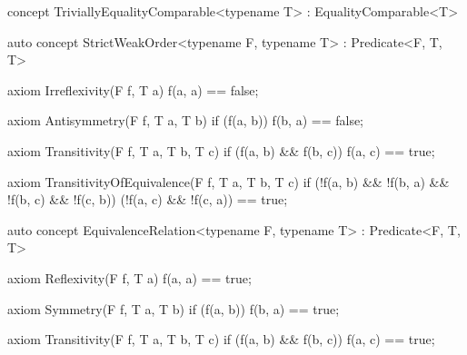 \documentclass[american,twoside]{book}
\begin{document}
\begin{itemdescr}
\pnum
{}
\end{itemdescr}

\begin{itemdecl}
concept TriviallyEqualityComparable<typename T> : EqualityComparable<T> { }
\end{itemdecl}

\begin{itemdescr}
\pnum 
{}

\pnum
{}
\end{itemdescr}

\begin{itemdecl}
auto concept StrictWeakOrder<typename F, typename T> : Predicate<F, T, T> {

  axiom Irreflexivity(F f, T a) { f(a, a) == false; }

  axiom Antisymmetry(F f, T a, T b) { 
    if (f(a, b)) 
      f(b, a) == false;
  }

  axiom Transitivity(F f, T a, T b, T c) {
    if (f(a, b) && f(b, c)) 
      f(a, c) == true;
  }

  axiom TransitivityOfEquivalence(F f, T a, T b, T c) {
    if (!f(a, b) && !f(b, a) && !f(b, c) && !f(c, b))
      (!f(a, c) && !f(c, a)) == true;
  }
}
\end{itemdecl}

\begin{itemdescr}
\pnum 
{}
\end{itemdescr}

\begin{itemdecl}
auto concept EquivalenceRelation<typename F, typename T> : Predicate<F, T, T> {
  axiom Reflexivity(F f, T a) { f(a, a) == true; }

  axiom Symmetry(F f, T a, T b) { 
    if (f(a, b)) 
      f(b, a) == true; 
  }

  axiom Transitivity(F f, T a, T b, T c) {
    if (f(a, b) && f(b, c))
      f(a, c) == true;
  }
}
\end{itemdecl}
\end{document}
